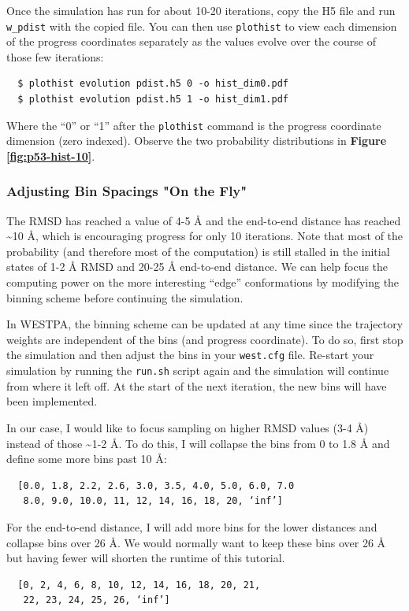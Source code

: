 Once the simulation has run for about 10-20 iterations, copy the H5 file and run \verb|w_pdist| with the copied file. 
You can then use \verb|plothist| to view each dimension of the progress coordinates separately as the values evolve over the course of those few iterations:
\begin{verbatim}
  $ plothist evolution pdist.h5 0 -o hist_dim0.pdf
  $ plothist evolution pdist.h5 1 -o hist_dim1.pdf
\end{verbatim}

Where the “0” or “1” after the \verb|plothist| command is the progress coordinate dimension (zero indexed). 
Observe the two probability distributions in \textbf{Figure \ref{fig:p53-hist-10}}.

\subsubsection{Adjusting Bin Spacings "On the Fly"}

The RMSD has reached a value of 4-5 \AA{} and the end-to-end distance has reached \textasciitilde 10 \AA{}, which is encouraging progress for only 10 iterations. 
Note that most of the probability (and therefore most of the computation) is still stalled in the initial states of 1-2 \AA{} RMSD and 20-25 \AA{} end-to-end distance. 
We can help  focus the computing power on the more interesting “edge” conformations by modifying the binning scheme before continuing the simulation.
  
In WESTPA, the binning scheme can be updated at any time since the trajectory weights are independent of the bins (and progress coordinate). 
To do so, first stop the simulation and then adjust the bins in your \verb|west.cfg| file. 
Re-start your simulation by running the \verb|run.sh| script again and the simulation will continue from where it left off. 
At the start of the next iteration, the new bins will have been implemented.  

In our case, I would like to focus sampling on higher RMSD values (3-4 \AA) instead of those \textasciitilde 1-2 \AA. 
To do this, I will collapse the bins from 0 to 1.8 \AA{} and define some more bins past 10 \AA:
\begin{verbatim}
  [0.0, 1.8, 2.2, 2.6, 3.0, 3.5, 4.0, 5.0, 6.0, 7.0
   8.0, 9.0, 10.0, 11, 12, 14, 16, 18, 20, ‘inf’]
\end{verbatim}

For the end-to-end distance, I will add more bins for the lower distances and collapse bins over 26 \AA. 
We would normally want to keep these bins over 26 \AA{} but having fewer will shorten the runtime of this tutorial.
\begin{verbatim}
  [0, 2, 4, 6, 8, 10, 12, 14, 16, 18, 20, 21,
   22, 23, 24, 25, 26, ‘inf’]
\end{verbatim}

